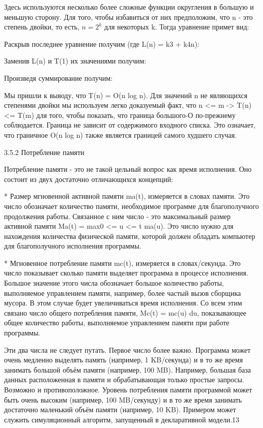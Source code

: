 Здесь используются несколько более сложные функции округления в большую и меньшую сторону. Для того, чтобы избавиться от них предположим, что n - это степень двойки, то есть, $n = 2^k$ для некоторых k. Тогда уравнение примет вид:

Раскрыв последнее уравнение получим (где L(n) = k3 + k4n):

Заменив L(n) и T(1) их значениями получим:

Произведя суммирование получим:

Мы пришли к выводу, что T(n) = O(n log n). Для значений n не являющихся степенями двойки мы используем легко доказуемый факт, что n <= m -> T(n) <= T(m) для того, чтобы показать, что граница большого-О по-прежнему соблюдается. Граница не зависит от содержимого входного списка. Это означает, что граничное O(n log n) также является границей самого худшего случая.

3.5.2 Потребление памяти

Потребление памяти - это не такой цельный вопрос как время исполнения. Оно состоит из двух достаточно отличающихся концепций:

* Размер мгновенной активной памяти ma(t), измеряется в словах памяти. Это число обозначает количество памяти, необходимое программе для благополучного продолжения работы. Связанное с ним число - это максимальный размер активной памяти Ma(t) = max0 <= u <= t ma(u). Это число нужно для нахождения количества физической памяти, которой должен обладать компьютер для благополучного исполнения программы.

* Мгновенное потребление памяти mc(t), измеряется в словах/секунда. Это число показывает сколько памяти выделяет программа в процессе исполнения. Большое значение этого числа обозначает большое количество работы, выполняемое управлением памяти, например, более частый вызов сборщика мусора. В этом случае будет увеличиваться время исполнения. Со всем этим связано число общего потребления памяти, Mc(t) = mc(u) du, показывающее общее количество работы, выполняемое управлением памяти при работе программы.

Эти два числа не следует путать. Первое число более важно. Программа может очень медленно выделять память (например, 1 KB/секунда) и в то же время занимать большой объём памяти (например, 100 MB). Например, большая база данных расположенная в памяти и обрабатывающая только простые запросы. Возможно и противоположное. Уровень потребления памяти программой может быть очень высоким (например, 100 MB/секунду) и в то же время занимать достаточно маленький объём памяти (например, 10 KB). Примером может служить симуляционный алгоритм, запущенный в декларативной модели.13

